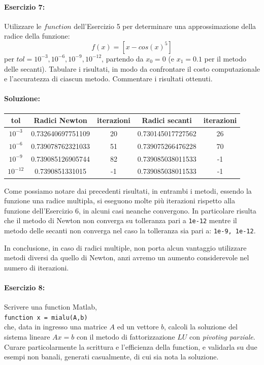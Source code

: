 \documentclass[12pt]{article}
\begin{document}
\paragraph{Esercizio 7:}Utilizzare le \(function\) dell'Esercizio 5 per determinare una approssimazione della radice della funzione:
$$f(x)=[x-cos(x)^5]$$
per \(tol = 10^{-3}, 10^{-6}, 10^{-9}, 10^{-12}\), partendo da \(x_0 = 0\) (e \(x_1 = 0.1\) per il metodo delle secanti). 
Tabulare i risultati, in modo da confrontare il costo computazionale e l’accuratezza di ciascun metodo. Commentare i risultati ottenuti.\pagebreak
\paragraph{Soluzione:}
\begin{center}
    \begin{tabular}{|| c || c | c || c | c||} 
        \hline
        tol & Radici Newton & iterazioni & Radici secanti & iterazioni\\
        \hline
        \(10^{-3}\) & 0.732640697751109 & 20 & 0.730145017727562 & 26\\
        \hline
        \(10^{-6}\) & 0.739078762321033 & 51 & 0.739075266476228 & 70\\
        \hline
        \(10^{-9}\) & 0.739085126905744 & 82 & 0.739085038011533 & -1\\
        \hline
        \(10^{-12}\) & 0.7390851331015 & -1 & 0.739085038011533 & -1\\
        \hline
    \end{tabular}
\end{center}
Come possiamo notare dai precedenti risultati, in entrambi i metodi, essendo la funzione una radice multipla, si eseguono molte più iterazioni rispetto alla funzione 
dell'Esercizio 6, in alcuni casi neanche convergono.
In particolare risulta che il metodo di Newton non converga su tolleranza pari a \texttt{1e-12} mentre il metodo delle secanti non converga nel caso la tolleranza sia pari a:
\texttt{1e-9, 1e-12}.

In conclusione, in caso di radici multiple, non porta alcun vantaggio utilizzare metodi diversi da quello di Newton, anzi avremo un aumento considerevole nel numero di iterazioni.
\paragraph{Esercizio 8:}Scrivere una function Matlab,\\
\texttt{function x = mialu(A,b)}\\
che, data in ingresso una matrice \(A\) ed un vettore \(b\), calcoli la soluzione del sistema lineare \(Ax = b\) con il metodo di fattorizzazione \(LU\) 
con \textit{pivoting parziale}. Curare particolarmente la scrittura e l’efficienza della function, e validarla su due esempi non banali, generati casualmente, 
di cui sia nota la soluzione.
\end{document}
